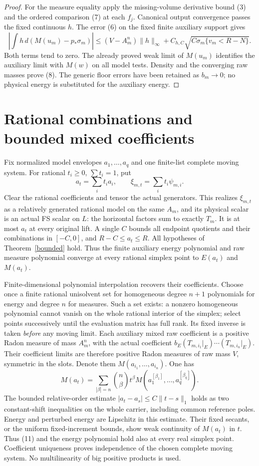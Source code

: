 \documentclass[11pt]{article}
\begin{document}
\begin{proof}
For the measure equality apply the missing-volume derivative
bound (3) and the ordered comparison (7) at each $f_j$.
Canonical output convergence passes the fixed continuous $h$.
The error (6) on the fixed finite auxiliary support gives
\[
 \left|\int h\,d(M(u_m)-p_*\sigma_m)\right|
 \leq (V-A_m^n)\|h\|_\infty
      +C_{h,C}\sqrt{C\sigma_m\{v_m<R-N\}}.              \tag{10}
\]
Both terms tend to zero. The already proved weak limit of $M(u_m)$
identifies the auxiliary limit with $M(w)$ on all model tests.
Density and the converging raw masses prove (8).
The generic floor errors have been retained as $b_m\to0$;
no physical energy is substituted for the auxiliary energy.
\end{proof}

\section{Rational combinations and bounded mixed coefficients}
Fix normalized model envelopes $a_1,\ldots,a_q$ and one finite-list
complete moving system. For rational $t_i\geq0$, $\sum t_i=1$, put
\[
 a_t=\sum_i t_ia_i,\qquad \xi_{m,t}=\sum_i t_i\psi_{m,i}.
\]
Clear the rational coefficients and tensor the actual generators.
This realizes $\xi_{m,t}$ as a relatively generated rational model
on the same $A_m$, and its physical scalar is an actual FS scalar
on $L$: the horizontal factors sum to exactly $T_m$.
It is at most $a_t$ at every original lift.
A single $C$ bounds all endpoint quotients and their combinations
in $[-C,0]$, and $R-C\leq a_t\leq R$.
All hypotheses of Theorem~\ref{bounded} hold.
Thus the finite auxiliary energy polynomial and raw measure polynomial
converge at every rational simplex point to $E(a_t)$ and $M(a_t)$.

Finite-dimensional polynomial interpolation recovers their coefficients.
Choose once a finite rational unisolvent set for homogeneous degree
$n+1$ polynomials for energy and degree $n$ for measures.
Such a set exists: a nonzero homogeneous polynomial cannot vanish
on the whole rational interior of the simplex; select points
successively until the evaluation matrix has full rank.
Its fixed inverse is taken \emph{before} any moving limit.
Each auxiliary mixed raw coefficient is a positive Radon measure
of mass $A_m^n$, with the actual coefficient
$b_E(T_{m,i_1}|_E)\cdots(T_{m,i_n}|_E)$.
Their coefficient limits are therefore positive Radon measures
of raw mass $V$, symmetric in the slots. Denote them
$M(a_{i_1},\ldots,a_{i_n})$.
One has
\[
 M(a_t)=\sum_{|\beta|=n}\binom n\beta t^\beta
                   M(a_1^{[\beta_1]},\ldots,a_q^{[\beta_q]}).
                                                               \tag{11}
\]
The bounded relative-order estimate
$|a_t-a_s|\leq C\|t-s\|_1$ holds as two constant-shift inequalities
on the whole carrier, including common reference poles.
Energy and perturbed energy are Lipschitz in this estimate.
Their fixed secants, or the uniform fixed-increment bounds,
show weak continuity of $M(a_t)$ in $t$.
Thus (11) and the energy polynomial hold also at every real simplex point.
Coefficient uniqueness proves independence of the chosen complete
moving system. No multilinearity of big positive products is used.
\end{document}
